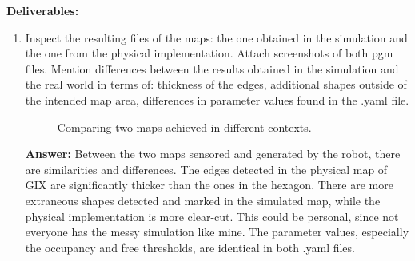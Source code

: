 \documentclass[12pt]{article}
\begin{document}
\textbf{Deliverables:}
\begin{enumerate}
    \item Inspect the resulting files of the maps: the one obtained in the simulation and the one from the physical implementation. Attach screenshots of both pgm files. Mention differences between the results obtained in the simulation and the real world in terms of: thickness of the edges, additional shapes outside of the intended map area, differences in parameter values found in the .yaml file.
    
    \begin{figure}
        \centering
        \hfill
        \caption{Comparing two maps achieved in different contexts.}
        \label{fig:map_pgm}\vspace{-10pt}
    \end{figure}

    \textbf{Answer: }Between the two maps sensored and generated by the robot, there are similarities and differences. The edges detected in the physical map of GIX are significantly thicker than the ones in the hexagon. There are more extraneous shapes detected and marked in the simulated map, while the physical implementation is more clear-cut. This could be personal, since not everyone has the messy simulation like mine. The parameter values, especially the occupancy and free thresholds, are identical in both .yaml files.
    

\end{enumerate}
\end{document}
